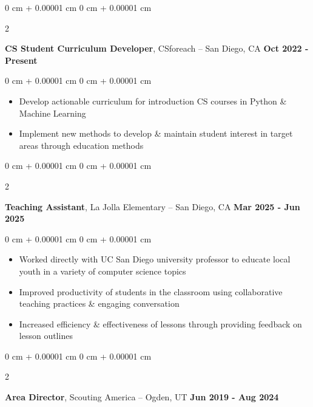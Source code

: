 \documentclass[10pt, letterpaper]{article}
\newenvironment{highlights}{
    \begin{itemize}[
        topsep=0.10 cm,
        parsep=0.10 cm,
        partopsep=0pt,
        itemsep=0pt,
        leftmargin=0 cm + 10pt
    ]
}{
    \end{itemize}
} %
\newenvironment{onecolentry}{
    \begin{adjustwidth}{
        0 cm + 0.00001 cm
    }{
        0 cm + 0.00001 cm
    }
}{
    \end{adjustwidth}
} %
\newenvironment{twocolentry}[2][]{
    \onecolentry%
    \def\secondColumn{#2}
    \setcolumnwidth{\fill, 7.0 cm}
    \begin{paracol}{2}
}{
    \switchcolumn\raggedleft\secondColumn%
    \end{paracol}
    \endonecolentry%
} %
\begin{document}
        \vspace{0.2 cm}

        \begin{twocolentry}{
            {\color{secondaryColor}\textbf{Oct 2022 - Present}}
        }
            \textbf{CS Student Curriculum Developer}, CSforeach -- San Diego, CA\end{twocolentry}

        \vspace{0.10 cm}
        \begin{onecolentry}
            \begin{highlights}
                \item Develop actionable curriculum for introduction CS courses in Python \& Machine Learning
                \item Implement new methods to develop \& maintain student interest in target areas through education methods
            \end{highlights}
        \end{onecolentry}


        \vspace{0.2 cm}

        \begin{twocolentry}{
            {\color{secondaryColor}\textbf{Mar 2025 - Jun 2025}}
        }
            \textbf{Teaching Assistant}, La Jolla Elementary -- San Diego, CA\end{twocolentry}

        \vspace{0.10 cm}
        \begin{onecolentry}
            \begin{highlights}
                \item Worked directly with UC San Diego university professor to educate local youth in a variety of computer science topics 
                \item Improved productivity of students in the classroom using collaborative teaching practices \& engaging conversation
                \item Increased efficiency \& effectiveness of lessons through providing feedback on lesson outlines
            \end{highlights}
        \end{onecolentry}
        
        \vspace{0.2 cm}


        \begin{twocolentry}{
            {\color{secondaryColor}\textbf{Jun 2019 - Aug 2024}}
        }
            \textbf{Area Director}, Scouting America -- Ogden, UT\end{twocolentry}
\end{document}

